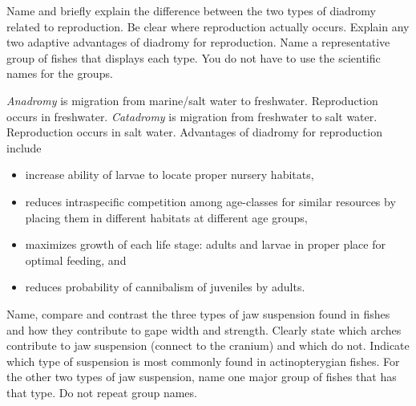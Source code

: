 \documentclass[11pt, addpoints]{exam}
\begin{document}
\begin{questions}
\newpage

\question[12]
Name and briefly explain the difference between the two types of diadromy related to reproduction. Be clear where reproduction actually occurs. Explain any two adaptive advantages of diadromy for reproduction.  Name a representative group of fishes that displays each type. You do not have to use the scientific names for the groups.

	\begin{solution}
	\textit{Anadromy} is migration from marine/salt water to freshwater. Reproduction occurs in freshwater. \textit{Catadromy} is migration from freshwater to salt water. Reproduction occurs in salt water.  Advantages of diadromy for reproduction include
	\begin{itemize}
		\item increase ability of larvae to locate proper nursery habitats, 
		\item reduces intraspecific competition among age-classes for similar resources by placing them in different habitats at different age groups,
		\item maximizes growth of each life stage: adults and larvae in proper place for optimal feeding, and
		\item reduces probability of cannibalism of juveniles by adults. 
	\end{itemize}
	\end{solution}



%




\newpage

\question[12]
Name, compare and contrast the three types of jaw suspension found in fishes and how they contribute to gape width and strength. Clearly state which arches contribute to jaw suspension (connect to the cranium) and which do not. Indicate which type of suspension is most commonly found in actinopterygian fishes. For the other two types of jaw suspension, name one major group of fishes that has that type. Do not repeat group names.


\end{questions}
\end{document}
